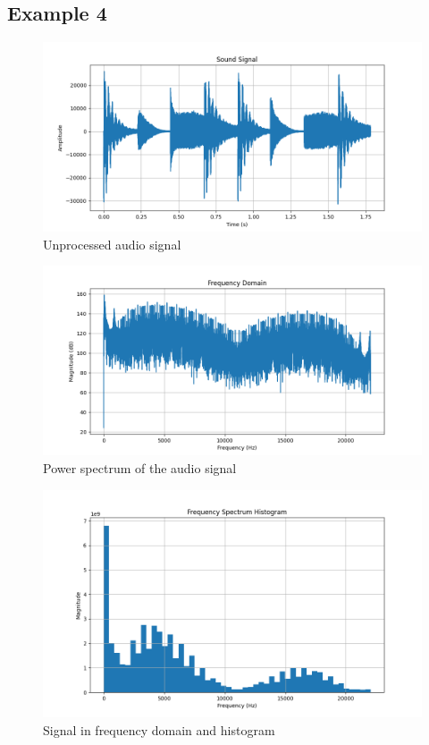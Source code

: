 \documentclass[a4paper,12pt,fleqn]{article}
\begin{document}
\subsection{Example 4}

\begin{figure}[H]
    \centering
    \includegraphics[width=1\textwidth]{ex5_raw.png}
    \caption{Unprocessed audio signal}
    \label{fig:ex5}
\end{figure}
\begin{figure}[H]
    \centering
    \includegraphics[width=1\textwidth]{ex5_frequency_domain.png}
    \caption{Power spectrum of the audio signal}
    \label{fig:ex5_freq}

\end{figure}

\begin{figure}[H]
    \centering
    \includegraphics[width=1\textwidth]{ex5_spectrum_histogram.png}
    \caption{Signal in frequency domain and histogram}
    \label{fig:ex5_hist}
\end{figure}
\end{document}
